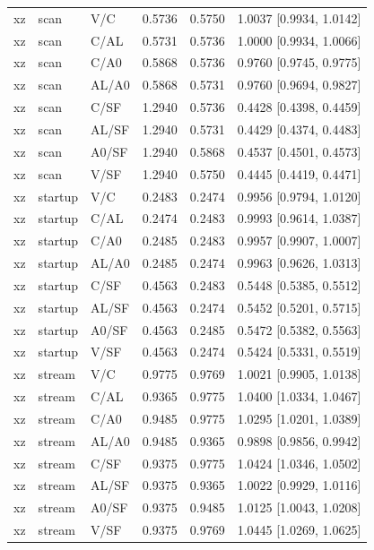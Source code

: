 \begin{longtable}{lllrrl}
xz & scan & V/C & 0.5736 & 0.5750 & 1.0037 [0.9934, 1.0142] \\
xz & scan & C/AL & 0.5731 & 0.5736 & 1.0000 [0.9934, 1.0066] \\
xz & scan & C/A0 & 0.5868 & 0.5736 & 0.9760 [0.9745, 0.9775] \\
xz & scan & AL/A0 & 0.5868 & 0.5731 & 0.9760 [0.9694, 0.9827] \\
xz & scan & C/SF & 1.2940 & 0.5736 & 0.4428 [0.4398, 0.4459] \\
xz & scan & AL/SF & 1.2940 & 0.5731 & 0.4429 [0.4374, 0.4483] \\
xz & scan & A0/SF & 1.2940 & 0.5868 & 0.4537 [0.4501, 0.4573] \\
xz & scan & V/SF & 1.2940 & 0.5750 & 0.4445 [0.4419, 0.4471] \\
xz & startup & V/C & 0.2483 & 0.2474 & 0.9956 [0.9794, 1.0120] \\
xz & startup & C/AL & 0.2474 & 0.2483 & 0.9993 [0.9614, 1.0387] \\
xz & startup & C/A0 & 0.2485 & 0.2483 & 0.9957 [0.9907, 1.0007] \\
xz & startup & AL/A0 & 0.2485 & 0.2474 & 0.9963 [0.9626, 1.0313] \\
xz & startup & C/SF & 0.4563 & 0.2483 & 0.5448 [0.5385, 0.5512] \\
xz & startup & AL/SF & 0.4563 & 0.2474 & 0.5452 [0.5201, 0.5715] \\
xz & startup & A0/SF & 0.4563 & 0.2485 & 0.5472 [0.5382, 0.5563] \\
xz & startup & V/SF & 0.4563 & 0.2474 & 0.5424 [0.5331, 0.5519] \\
xz & stream & V/C & 0.9775 & 0.9769 & 1.0021 [0.9905, 1.0138] \\
xz & stream & C/AL & 0.9365 & 0.9775 & 1.0400 [1.0334, 1.0467] \\
xz & stream & C/A0 & 0.9485 & 0.9775 & 1.0295 [1.0201, 1.0389] \\
xz & stream & AL/A0 & 0.9485 & 0.9365 & 0.9898 [0.9856, 0.9942] \\
xz & stream & C/SF & 0.9375 & 0.9775 & 1.0424 [1.0346, 1.0502] \\
xz & stream & AL/SF & 0.9375 & 0.9365 & 1.0022 [0.9929, 1.0116] \\
xz & stream & A0/SF & 0.9375 & 0.9485 & 1.0125 [1.0043, 1.0208] \\
xz & stream & V/SF & 0.9375 & 0.9769 & 1.0445 [1.0269, 1.0625] \\
\bottomrule\end{longtable}
